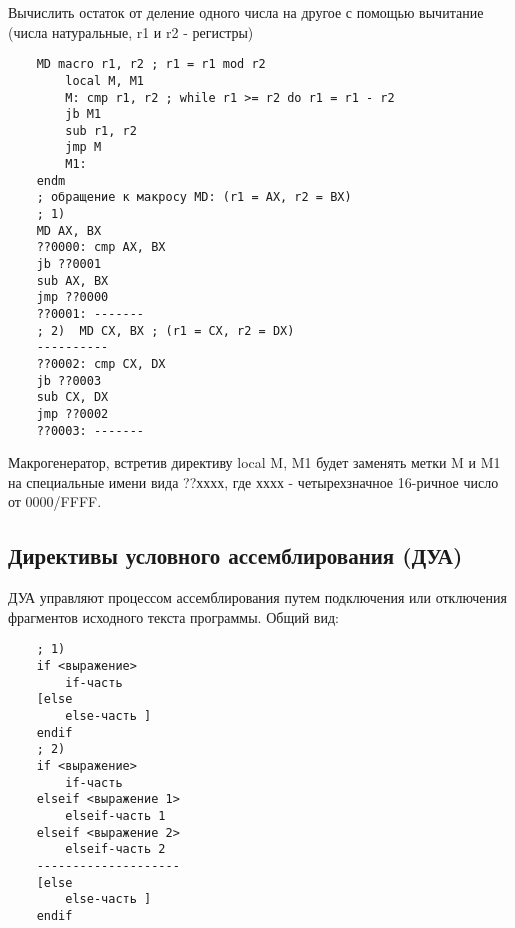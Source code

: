 Вычислить остаток от деление одного числа на другое с помощью вычитание (числа натуральные, r1 и r2 - регистры)
\begin{verbatim}
    MD macro r1, r2 ; r1 = r1 mod r2
        local M, M1
        M: cmp r1, r2 ; while r1 >= r2 do r1 = r1 - r2
        jb M1
        sub r1, r2
        jmp M
        M1:
    endm
    ; обращение к макросу MD: (r1 = AX, r2 = BX)
    ; 1)
    MD AX, BX
    ??0000: cmp AX, BX
    jb ??0001
    sub AX, BX
    jmp ??0000
    ??0001: -------
    ; 2)  MD CX, BX ; (r1 = CX, r2 = DX)
    ----------
    ??0002: cmp CX, DX
    jb ??0003
    sub CX, DX
    jmp ??0002
    ??0003: -------
\end{verbatim}

Макрогенератор, встретив директиву local M, M1 будет заменять метки M и M1 на специальные имени вида ??хххх, где хххх - четырехзначное 16-ричное число от 0000/FFFF.
\subsection{Директивы условного ассемблирования (ДУА)}
ДУА управляют процессом ассемблирования путем подключения или отключения фрагментов исходного текста программы. Общий вид:
\begin{verbatim}
    ; 1)
    if <выражение>
        if-часть
    [else
        else-часть ]
    endif
    ; 2)
    if <выражение>
        if-часть
    elseif <выражение 1>
        elseif-часть 1
    elseif <выражение 2>
        elseif-часть 2
    --------------------
    [else
        else-часть ]
    endif
\end{verbatim}

